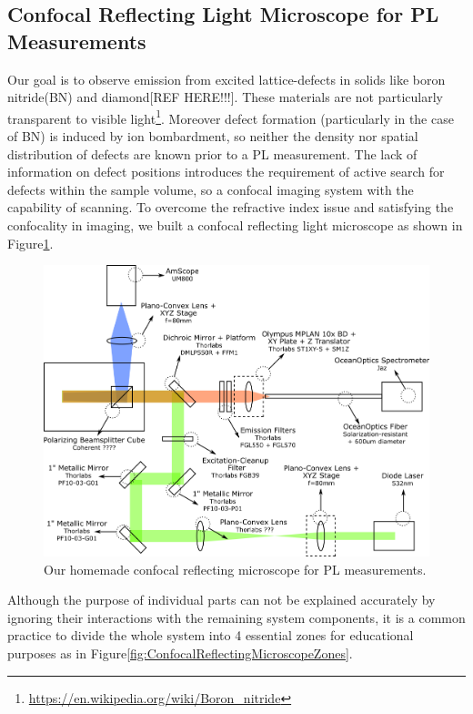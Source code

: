 \subsection{Confocal Reflecting Light Microscope for PL Measurements}

Our goal is to observe emission from excited lattice-defects in solids like boron 
nitride(BN) and diamond[REF HERE!!!]. These materials are not particularly transparent
to visible light\footnote{\url{https://en.wikipedia.org/wiki/Boron_nitride}}. Moreover
defect formation (particularly in the case of BN) is induced by ion bombardment, so
neither the density nor spatial distribution of defects are known prior to a PL 
measurement. The lack of information on defect positions introduces the requirement 
of active search for defects within the sample volume, so a confocal imaging system 
with the capability of scanning. To overcome the refractive index issue and satisfying 
the confocality in imaging, we built a confocal reflecting light microscope as shown
in Figure\ref{fig:ConfocalReflectingMicroscopeFull}.

\begin{figure}[H]
	\centering
	\includegraphics[angle=0,origin=c,width = 0.95\linewidth]{Section_Microscope/Figures/PL_Setup_Parts.png}
	\caption{Our homemade confocal reflecting microscope for PL measurements.}
	\label{fig:ConfocalReflectingMicroscopeFull}
\end{figure}

Although the purpose of individual parts can not be explained accurately by ignoring their 
interactions with the remaining system components, it is a common practice to divide the whole 
system into 4 essential zones for educational purposes as in Figure\ref{fig:ConfocalReflectingMicroscopeZones}. 


